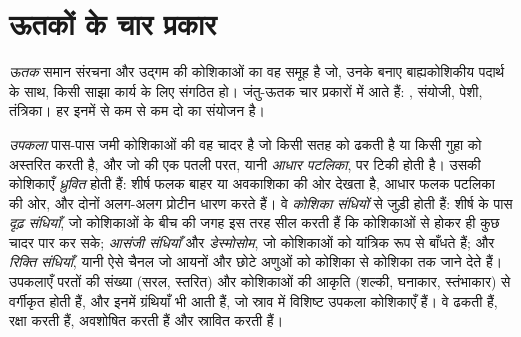 \section{ऊतकों के चार प्रकार}

\begin{definition}[ऊतक]\label{def:b1:body-plans-tissues:tissue}
\emph{ऊतक} समान संरचना और उद्गम की कोशिकाओं का वह समूह है
जो, उनके बनाए बाह्यकोशिकीय पदार्थ के साथ, किसी साझा कार्य के लिए संगठित
हो। जंतु-ऊतक चार प्रकारों में आते हैं: , संयोजी, पेशी, तंत्रिका। हर
 इनमें से कम से कम दो का संयोजन है।
\end{definition}

\begin{definition}\label{def:b1:body-plans-tissues:epithelium}
\emph{उपकला} पास-पास जमी कोशिकाओं की वह चादर है जो किसी
सतह को ढकती है या किसी गुहा को अस्तरित करती है, और जो  की एक पतली परत, यानी \emph{आधार पटलिका}, पर
टिकी होती है। उसकी कोशिकाएँ \emph{ध्रुवित} होती
हैं: शीर्ष फलक बाहर या अवकाशिका की ओर देखता है, आधार फलक पटलिका की ओर,
और दोनों अलग-अलग प्रोटीन धारण करते हैं। वे \emph{कोशिका
संधियों} से जुड़ी होती हैं: शीर्ष के पास
\emph{दृढ़ संधियाँ}, जो कोशिकाओं के बीच की जगह इस तरह सील करती हैं कि
कोशिकाओं से होकर ही कुछ चादर पार कर सके; \emph{आसंजी संधियाँ} और
\emph{डेस्मोसोम}, जो कोशिकाओं को यांत्रिक रूप से बाँधते हैं; और
\emph{रिक्ति संधियाँ}, यानी ऐसे चैनल जो आयनों और छोटे अणुओं को कोशिका से
कोशिका तक जाने देते हैं। उपकलाएँ परतों की संख्या (सरल, स्तरित) और
कोशिकाओं की आकृति (शल्की, घनाकार, स्तंभाकार) से वर्गीकृत होती हैं, और
इनमें ग्रंथियाँ भी आती हैं, जो स्राव में विशिष्ट उपकला कोशिकाएँ हैं। वे
ढकती हैं, रक्षा करती हैं, अवशोषित करती हैं और स्रावित करती हैं।
\end{definition}

